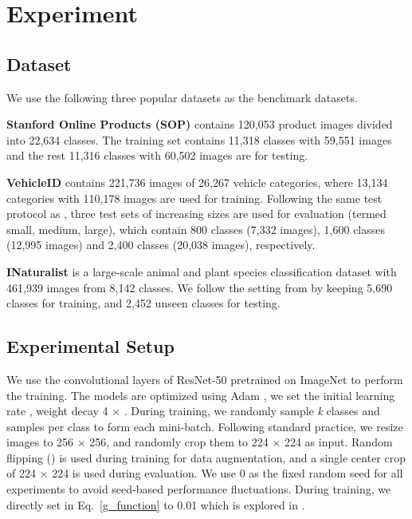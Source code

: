 \section{Experiment}


\subsection{Dataset}

\noindent We use the following three popular datasets as the benchmark datasets.

\noindent \textbf{Stanford Online Products (SOP) }\cite{Song-DML-CVPR2016} contains 120,053 product images divided into 22,634 classes. The training set contains 11,318 classes with 59,551 images and the rest 11,316 classes with 60,502 images are for testing.



\noindent \textbf{VehicleID }\cite{liu2016deep} contains 221,736 images of 26,267 vehicle categories, where  13,134 categories with  110,178 images are used for training. Following the same test protocol as \cite{liu2016deep}, three test sets of increasing sizes are used for evaluation (termed small, medium, large), which contain 800 classes (7,332 images), 1,600 classes (12,995 images) and 2,400 classes (20,038 images), respectively.


\noindent \textbf{INaturalist }\cite{van2018inaturalist} is a large-scale animal and plant species classification dataset with 461,939 images from 8,142 classes. We follow the  setting from \cite{2020smoothap} by keeping 5,690 classes for training, and 2,452 unseen classes for testing.




\subsection{Experimental Setup}

\noindent We use the convolutional layers of ResNet-50 pretrained on ImageNet \cite{resnet2016} to perform the training. The models are optimized using Adam \cite{adam2014}, we set the initial learning rate , weight decay 4 × . During training, we randomly sample \textit{k} classes and  samples per class to form each mini-batch. Following standard practice, we resize images to 256 × 256, and randomly crop them to 224 × 224 as input. Random flipping () is used during training for data augmentation, and a single center crop of 224 × 224 is used during evaluation. We use 0 as the fixed random seed for all experiments to avoid seed-based performance fluctuations.  During training, we directly set  in Eq.~\ref{g_function} to 0.01 which is explored in \cite{2020smoothap}.

